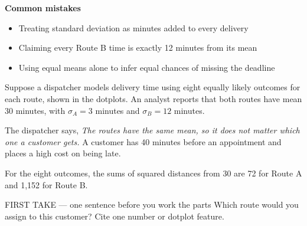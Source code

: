 \documentclass[11pt]{article}
\begin{document}
\textbf{Common mistakes}
\begin{itemize}[leftmargin=1.5em,itemsep=2pt,topsep=2pt]
  \item Treating standard deviation as minutes added to every delivery
  \item Claiming every Route B time is exactly 12 minutes from its mean
  \item Using equal means alone to infer equal chances of missing the deadline
\end{itemize}

\clearpage
{}

Suppose a dispatcher models delivery time using eight equally likely outcomes for each route, shown in the dotplots. An analyst reports that both routes have mean 30 minutes, with $\sigma_A=3$ minutes and $\sigma_B=12$ minutes.\par\smallskip The dispatcher says, \emph{The routes have the same mean, so it does not matter which one a customer gets.} A customer has 40 minutes before an appointment and places a high cost on being late.\par For the eight outcomes, the sums of squared distances from 30 are 72 for Route A and 1,152 for Route B.\par
\begin{center}
\par\smallskip
{}
\end{center}
\begin{firsttakebox}{FIRST TAKE --- one sentence before you work the parts}
Which route would you assign to this customer? Cite one number or dotplot feature.\par
{}
\end{firsttakebox}
\end{document}
